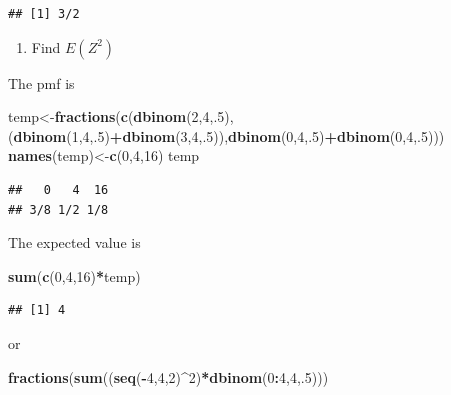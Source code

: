 \documentclass[]{book}
\newenvironment{Shaded}{\begin{snugshade}}{\end{snugshade}}
\newcommand{\KeywordTok}[1]{\textcolor[rgb]{0.13,0.29,0.53}{\textbf{#1}}}
\newcommand{\DecValTok}[1]{\textcolor[rgb]{0.00,0.00,0.81}{#1}}
\newcommand{\OperatorTok}[1]{\textcolor[rgb]{0.81,0.36,0.00}{\textbf{#1}}}
\newcommand{\NormalTok}[1]{#1}
\providecommand{\tightlist}{%
  \setlength{\itemsep}{0pt}\setlength{\parskip}{0pt}}
\theoremstyle{definition}
\theoremstyle{definition}
\theoremstyle{definition}
\theoremstyle{remark}
\begin{document}
\begin{verbatim}
## [1] 3/2
\end{verbatim}

\begin{enumerate}
\def\labelenumi{\arabic{enumi}.}
\setcounter{enumi}{2}
\tightlist
\item
  Find \(E(Z^2)\)
\end{enumerate}

The pmf is

\begin{Shaded}
\begin{Highlighting}[]
\NormalTok{temp<-}\KeywordTok{fractions}\NormalTok{(}\KeywordTok{c}\NormalTok{(}\KeywordTok{dbinom}\NormalTok{(}\DecValTok{2}\NormalTok{,}\DecValTok{4}\NormalTok{,.}\DecValTok{5}\NormalTok{),(}\KeywordTok{dbinom}\NormalTok{(}\DecValTok{1}\NormalTok{,}\DecValTok{4}\NormalTok{,.}\DecValTok{5}\NormalTok{)}\OperatorTok{+}\KeywordTok{dbinom}\NormalTok{(}\DecValTok{3}\NormalTok{,}\DecValTok{4}\NormalTok{,.}\DecValTok{5}\NormalTok{)),}\KeywordTok{dbinom}\NormalTok{(}\DecValTok{0}\NormalTok{,}\DecValTok{4}\NormalTok{,.}\DecValTok{5}\NormalTok{)}\OperatorTok{+}\KeywordTok{dbinom}\NormalTok{(}\DecValTok{0}\NormalTok{,}\DecValTok{4}\NormalTok{,.}\DecValTok{5}\NormalTok{)))}
\KeywordTok{names}\NormalTok{(temp)<-}\KeywordTok{c}\NormalTok{(}\DecValTok{0}\NormalTok{,}\DecValTok{4}\NormalTok{,}\DecValTok{16}\NormalTok{)}
\NormalTok{temp}
\end{Highlighting}
\end{Shaded}

\begin{verbatim}
##   0   4  16 
## 3/8 1/2 1/8
\end{verbatim}

The expected value is

\begin{Shaded}
\begin{Highlighting}[]
\KeywordTok{sum}\NormalTok{(}\KeywordTok{c}\NormalTok{(}\DecValTok{0}\NormalTok{,}\DecValTok{4}\NormalTok{,}\DecValTok{16}\NormalTok{)}\OperatorTok{*}\NormalTok{temp)}
\end{Highlighting}
\end{Shaded}

\begin{verbatim}
## [1] 4
\end{verbatim}

or

\begin{Shaded}
\begin{Highlighting}[]
\KeywordTok{fractions}\NormalTok{(}\KeywordTok{sum}\NormalTok{((}\KeywordTok{seq}\NormalTok{(}\OperatorTok{-}\DecValTok{4}\NormalTok{,}\DecValTok{4}\NormalTok{,}\DecValTok{2}\NormalTok{)}\OperatorTok{^}\DecValTok{2}\NormalTok{)}\OperatorTok{*}\KeywordTok{dbinom}\NormalTok{(}\DecValTok{0}\OperatorTok{:}\DecValTok{4}\NormalTok{,}\DecValTok{4}\NormalTok{,.}\DecValTok{5}\NormalTok{)))}
\end{Highlighting}
\end{Shaded}
\end{document}
